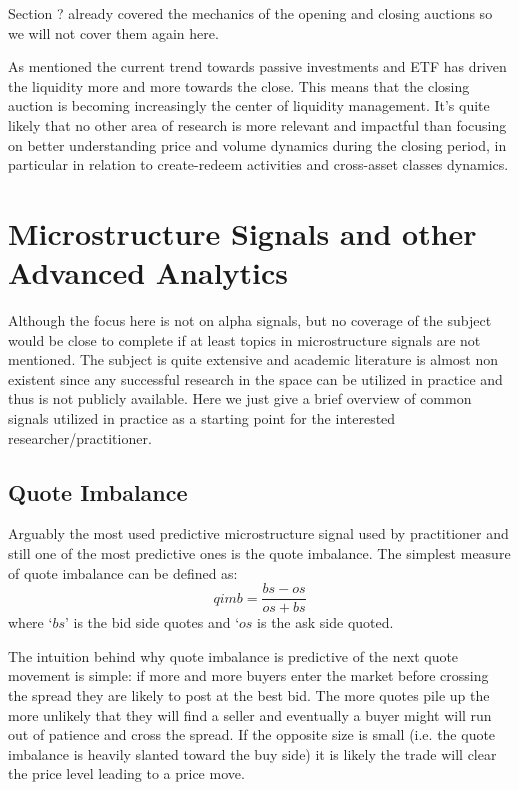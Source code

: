 Section ? already covered the mechanics of the opening and closing auctions so we will not cover them again here.



As mentioned the current trend towards passive investments and ETF has driven the liquidity more and more towards the close. This means that the closing auction is becoming increasingly the center of liquidity management.  It's quite likely that no other area of research is more relevant and impactful than focusing on better understanding price and volume dynamics during the closing period, in particular in relation to create-redeem activities and cross-asset classes dynamics.


\section{Microstructure Signals and other Advanced Analytics}

Although the focus here is not on alpha signals, but no coverage of the subject would be close to complete if at least topics in microstructure signals are not mentioned. The subject is quite extensive and academic literature is almost non existent since any successful research in the space can be utilized in practice and thus is not publicly available. Here we just give a brief overview of common signals utilized in practice as a starting point for the interested researcher/practitioner.


\subsection{Quote Imbalance}

Arguably the most used predictive microstructure signal used by practitioner and still one of the most predictive ones is the quote imbalance.  The simplest measure of quote imbalance can be defined as: 
	\begin{equation}\label{eq:q_imb}
		qimb = \frac{bs - os}{os + bs}
	\end{equation}
where `$bs$' is the bid side quotes and `$os$ is the ask side quoted. 
	
The intuition behind why quote imbalance is predictive of the next quote movement is simple: if more and more buyers enter the market before crossing the spread they are likely to post at the best bid. The more quotes pile up the more unlikely that they will find a seller and eventually a buyer might will run out of patience and cross the spread. If the opposite size is small (i.e. the quote imbalance is heavily slanted toward the buy side) it is likely the trade will clear the price level leading to a price move.


